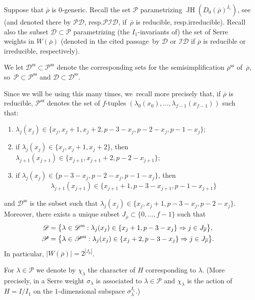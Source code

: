 \documentclass[10pt]{amsart}
\newcommand{\resp}{resp.}
\newcommand{\D}{\mathscr D}
\renewcommand{\P}{\mathscr P}
\renewcommand{\ss}{\mathrm{ss}}
\newcommand{\rhobar}{\overline{\rho}}
\newcommand{\brho}{\overline{\rho}}
\DeclareMathOperator{\JH}{\mathrm{JH}}
\theoremstyle{plain}
\theoremstyle{definition}
\newcommand{\loccit}{the cited passage}
\begin{document}
Suppose that $\rhobar$ is $0$-generic. Recall the set $\P$ parametrizing $\JH(D_0(\rhobar)^{I_1})$, see \cite[\S 4]{breuil-buzzati} (and denoted there by $\mathscr{PD}$, \resp $\mathscr{PID}$, if~$\rhobar$ is reducible, \resp irre\-ducible). Recall also the subset $\D \subset \P$ parametrizing (the $I_1$-invariants of) the set of Serre weights in $W(\brho)$ (denoted in \loccit\ by $\D$ or $\mathscr{ID}$ if $\rhobar$ is reducible or irreducible, respectively).

We let $\D^\ss\subset \P^\ss$ denote the corresponding sets for the semisimplification $\rhobar^\ss$ of~$\rhobar$, so~$\P \subset \P^\ss$ and $\D \subset \D^\ss$.

Since we will be using this many times, we~recall more precisely that, if $\brho$ is reducible, $\P^\ss$ denotes the set of $f$-tuples $(\lambda_0(x_0),\dots,\lambda_{f-1}(x_{f-1}))$ such that:
\begin{enumerate}
\item $\lambda_j(x_j) \in \{x_j,x_j+1,x_j+2,p-3-x_j,p-2-x_j,p-1-x_j\}$;
\item if $\lambda_j(x_j) \in \{x_j,x_j+1,x_j+2\}$, then $\lambda_{j+1}(x_{j+1}) \in \{x_{j+1},x_{j+1}+2,p-2-x_{j+1}\}$;
\item if $\lambda_j(x_j) \in \{p-3-x_j,p-2-x_j,p-1-x_j\}$, then
\[
\lambda_{j+1}(x_{j+1}) \in \{x_{j+1}+1,p-3-x_{j+1},p-1-x_{j+1}\}
\]
\end{enumerate}
and $\D^\ss$ is the subset such that $\lambda_j(x_j) \in \{x_j,x_j+1,p-3-x_j,p-2-x_j\}$.
Moreover, there exists a unique subset $J_{\rhobar} \subset \{0,\dots,f-1\}$ such that\vspace*{-3pt}
\begin{align}
\D &= \bigl\{\lambda \in \D^\ss: \lambda_j(x_j) \in \{x_j+1,p-3-x_j\} \Rightarrow j \in J_{\rhobar}\bigr\},\notag \\
\P &= \bigl\{\lambda \in \P^\ss: \lambda_j(x_j) \in \{x_j+2,p-3-x_j\} \Rightarrow j \in J_{\rhobar}\bigr\}.\label{eq:P}
\end{align}
In particular, $|W(\brho)| = 2^{|J_{\brho}|}$.

For $\lambda\in\mathscr{P}$ we denote by $\chi_\lambda$ the character of $H$ corresponding to $\lambda$.
(More precisely, in \cite[\S 4]{breuil-buzzati} a Serre weight $\sigma_\lambda$ is associated to $\lambda \in \P$ and $\chi_\lambda$ is the action of $H=I/I_1$ on the $1$-dimensional subspace $\sigma_\lambda^{I_1}$.)
\end{document}
